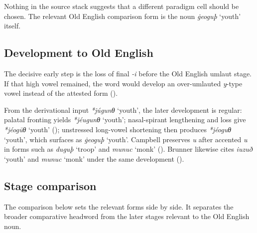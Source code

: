 \documentclass[
  british,
  a4paper,
  openany]{book}
\providecommand{\Recon}[1]{\emph{*#1}}
{\catcode`→=\active \global\def→{\ensuremath{\rightarrow}}}
\providecommand{\Recon}[1]{\emph{*#1}}
{\catcode`→=\active \global\def→{\ensuremath{\rightarrow}}}
\begin{document}
Nothing in the source stack suggests that a different paradigm cell
should be chosen. The relevant Old English comparison form is the noun
{\emph{ġeoguþ}} `youth' itself.

\subsection{Development to Old
English}\label{development-to-old-english-107}

The decisive early step is the loss of final \emph{-i} before the Old
English umlaut stage. If that high vowel remained, the word would
develop an over-umlauted \emph{y}-type vowel instead of the attested
form ().

From the derivational input {\Recon{júgunθ} `youth'}, the later
development is regular: palatal fronting yields \Recon{jéugunθ} `youth';
nasal-spirant lengthening and loss give \Recon{jéogūθ} `youth'
(); unstressed long-vowel
shortening then produces \Recon{jéoguθ} `youth', which surfaces as
{\emph{ġeoguþ}} `youth'. Campbell preserves \emph{u} after accented
\emph{u} in forms such as {\emph{duguþ}} `troop' and {\emph{munuc}}
`monk' (). Brunner
likewise cites {\emph{iuzuð}} `youth' and {\emph{munuc}} `monk' under
the same development ().

\subsection{Stage comparison}\label{stage-comparison-4}

The comparison below sets the relevant forms side by side. It separates
the broader comparative headword from the later stages relevant to the
Old English noun.
\end{document}
